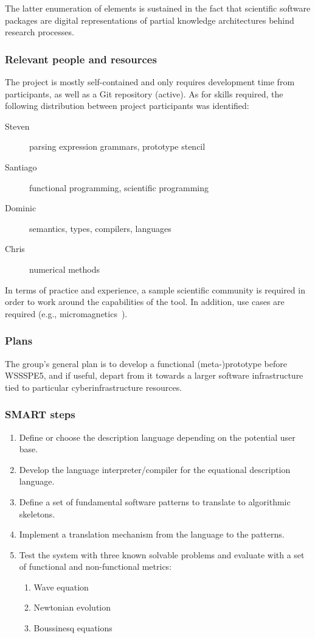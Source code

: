 The latter enumeration of elements is sustained in the fact that scientific
software packages are digital representations of partial knowledge architectures
behind research processes.

\subsubsection{Relevant people and resources}

The project is mostly self-contained and only requires development time from
participants, as well as a Git repository (active). As for skills required, the
following distribution between project participants was identified:

\begin{description}
  \item[Steven] parsing expression grammars, prototype stencil
  \item[Santiago] functional programming, scientific programming
  \item[Dominic] semantics, types, compilers, languages
  \item[Chris] numerical methods
\end{description}

In terms of practice and experience, a sample scientific community is required
in order to work around the capabilities of the tool. In addition, use cases
are required (e.g., micromagnetics~\cite{fischbacher2007systematic}).

\subsubsection{Plans}

The group's general plan is to develop a functional (meta-)prototype before WSSSPE5, and
if useful, depart from it towards a larger software infrastructure tied to
particular cyberinfrastructure resources.

\subsubsection{SMART steps}

\begin{enumerate}
  \item Define or choose the description language depending on the potential user
  base.
  \item Develop the language interpreter/compiler for the equational description
  language.
  \item Define a set of fundamental software patterns to translate to algorithmic
  skeletons.
  \item Implement a translation mechanism from the language to the patterns.
  \item Test the system with three known solvable problems and evaluate with a
  set of functional and non-functional metrics:
  \begin{enumerate}
    \item Wave equation
    \item Newtonian evolution
    \item Boussinesq equations
  \end{enumerate}
\end{enumerate}

